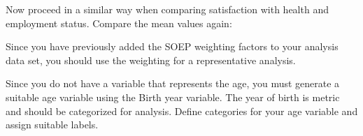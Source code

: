 \documentclass[letterpaper,10pt,openany,onesideH,english]{sphinxmanual}
\begin{document}
\begin{figure}[H]
\centering

\noindent{}
\end{figure}


Now proceed in a similar way when comparing satisfaction with health and employment status. Compare the mean values again:

%
\begin{sphinxVerbatim}[commandchars=\\\{\},numbers=left,firstnumber=1,stepnumber=1]
   
	  
\end{sphinxVerbatim}

\begin{figure}[H]
\centering

\noindent{}
\end{figure}

Since you have previously added the SOEP weighting factors to your analysis data set, you should use the weighting for a representative analysis.

%
\begin{sphinxVerbatim}[commandchars=\\\{\},numbers=left,firstnumber=1,stepnumber=1]
	  \PYG{p}{[}\PYG{p}{]} 
\end{sphinxVerbatim}

\begin{figure}[H]
\centering

\noindent{}
\end{figure}


Since you do not have a variable that represents the age, you must generate a suitable age variable using the Birth year variable. The year of birth is metric and should be categorized for analysis. Define categories for your age variable and assign suitable labels.
\end{document}
